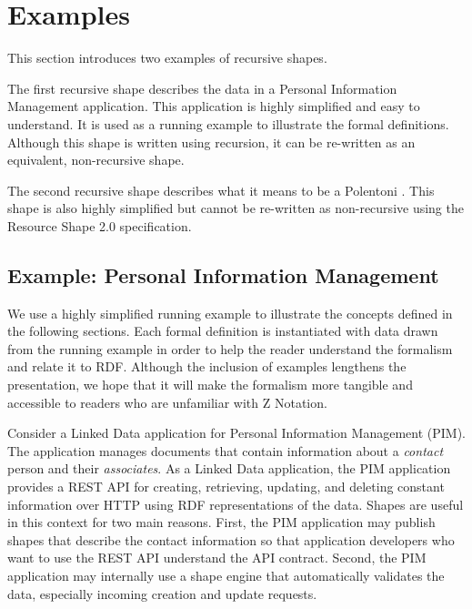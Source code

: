 \documentclass{article}
\begin{document}
\section{Examples}
\label{sec-examples}

This section introduces two examples of recursive shapes.

The first recursive shape describes the data in a Personal Information Management application.
This application is highly simplified and easy to understand. 
It is used as a running example to illustrate the formal definitions.
Although this shape is written using recursion, it can be re-written as an equivalent, non-recursive shape.

The second recursive shape describes what it means to be a Polentoni \cite{peter:polentoni}.
This shape is also highly simplified but cannot be re-written as non-recursive using the Resource Shape 2.0 specification.

\subsection{Example: Personal Information Management}
\label{sec-pim}
We use a highly simplified running example to illustrate the concepts defined in the following sections.
Each formal definition is instantiated with data drawn from the running example in order to help the reader understand the
formalism and relate it to RDF.
Although the inclusion of examples lengthens the presentation, we hope that it will make the formalism more tangible and accessible
to readers who are unfamiliar with Z Notation.

Consider a Linked Data \cite{tbl:ld} application for Personal Information Management (PIM).
The application manages documents that contain information about a {\em contact} person and their {\em associates}.
\cbstart
As a Linked Data application, the PIM application provides a REST API for creating, retrieving, updating, and deleting constant information
over HTTP using RDF representations of the data.
Shapes are useful in this context for two main reasons.
First, the PIM application may publish shapes that describe the contact information so that application developers who want to use
the REST API understand the API contract.
Second, the PIM application may internally use a shape engine that automatically validates the data, especially incoming creation and update requests.
\end{document}
